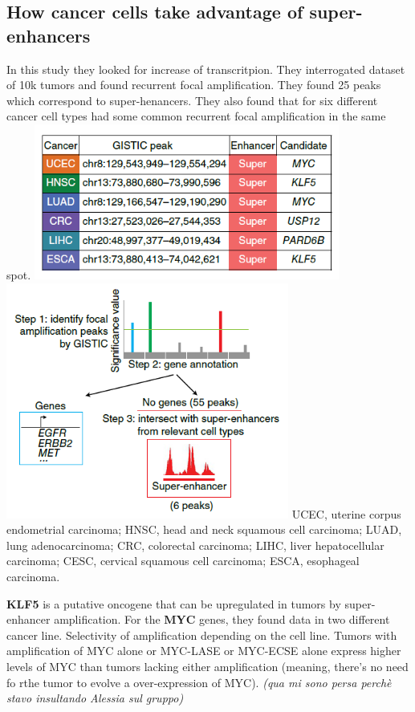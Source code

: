 \hypertarget{how-cancer-cells-take-advantage-of-super-enhancers}{%
\subsection{How cancer cells take advantage of super-enhancers}\label{how-cancer-cells-take-advantage-of-super-enhancers}}

In this study they looked for increase of transcritpion. They interrogated dataset of 10k tumors and found recurrent focal amplification. They found 25 peaks which correspond to super-henancers. They also found that for six different cancer cell types had some common recurrent focal amplification in the same spot.
\includegraphics{../_resources/796c982294bedb0a7994a942aa5ff2a5.png}
\includegraphics{../_resources/85250d5cfb0f02d4fd06f8a7ae09e4a3.png}
UCEC, uterine corpus endometrial carcinoma; HNSC, head and neck squamous cell carcinoma; LUAD, lung adenocarcinoma; CRC, colorectal carcinoma; LIHC, liver hepatocellular carcinoma; CESC, cervical squamous cell carcinoma; ESCA, esophageal carcinoma.

\textbf{KLF5} is a putative oncogene that can be upregulated in tumors by super-enhancer amplification.
For the \textbf{MYC} genes, they found data in two different cancer line. Selectivity of amplification depending on the cell line.
Tumors with amplification of MYC alone or MYC-LASE or MYC-ECSE alone express higher levels of MYC than tumors lacking either amplification (meaning, there's no need fo rthe tumor to evolve a over-expression of MYC).
\emph{(qua mi sono persa perchè stavo insultando Alessia sul gruppo)}

